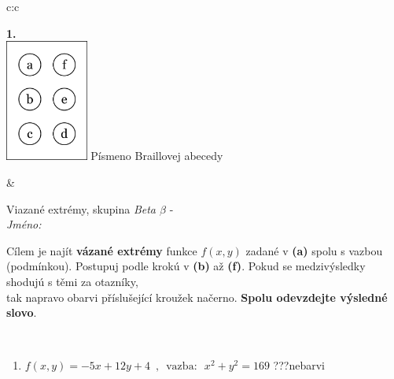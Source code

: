 \documentclass[10pt]{report}
\begin{document}
\begin{tabular}{c:c}
\begin{minipage}[c][104.5mm][t]{0.5\linewidth}
\begin{center}
\begin{minipage}{0.79\linewidth}
\begin{center}
\begin{varwidth}{\linewidth}
\begin{enumerate}
\end{enumerate}
\end{varwidth}
\end{center}
\end{minipage}
\begin{minipage}{0.20\linewidth}
\begin{center}
{\Huge\bfseries 1.} \\[2mm]
\includegraphics[height=40mm]{../images/braille.png}
{\small Písmeno Braillovej abecedy}
\end{center}
\end{minipage}
\end{center}
\end{minipage}
&
\begin{minipage}[c][104.5mm][t]{0.5\linewidth}
\begin{center}
\vspace{7mm}
{\huge Viazané extrémy, skupina \textit{Beta $\beta$} -}\\[5mm]
\textit{Jméno:}\phantom{xxxxxxxxxxxxxxxxxxxxxxxxxxxxxxxxxxxxxxxxxxxxxxxxxxxxxxxxxxxxxxxxx}\\[5mm]
\begin{minipage}{0.95\linewidth}
\begin{center}
Cílem je najít \textbf{vázané extrémy} funkce $f(x,y)$ zadané v \textbf{(a)} spolu s vazbou (podmínkou). Postupuj podle krokú v \textbf{(b)} až \textbf{(f)}. Pokud se medzivýsledky shodujú s těmi za otazníky,\\tak napravo obarvi příslušející kroužek načerno. \textbf{Spolu odevzdejte výsledné slovo}.
\end{center}
\end{minipage}
\\[1mm]
\begin{minipage}{0.79\linewidth}
\begin{center}
\begin{varwidth}{\linewidth}
\begin{enumerate}
\normalsize
\item $f(x,y)=-5x+12y+4 \enspace , \enspace \mathrm{vazba:} \enspace x^2+y^2=169$\quad \dotfill\; ???\;\dotfill \quad nebarvi

\end{enumerate}
\end{varwidth}
\end{center}
\end{minipage}
\end{center}
\end{minipage}
\end{tabular}
\end{document}
